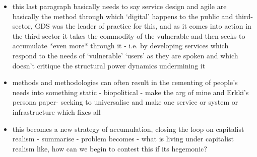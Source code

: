 \begin{itemize}
\item
  this last paragraph basically needs to say service design and agile
  are basically the method through which `digital' happens to the public
  and third-sector, GDS was the leader of practice for this, and as it
  comes into action in the third-sector it takes the commodity of the
  vulnerable and then seeks to accumulate *even more* through it - i.e.
  by developing services which respond to the needs of `vulnerable'
  `users' as they are spoken and which doesn't critique the structural
  power dynamics undermining it
\item
  methods and methodologies can often result in the cementing of
  people's needs into something static - biopolitical - make the arg of
  mine and Erkki's persona paper- seeking to universalise and make one
  service or system or infrastructure which fixes all
\item
  this becomes a new strategy of accumulation, closing the loop on
  capitalist realism - summarise - problem becomes - what is living
  under capitalist realism like, how can we begin to contest this if its
  hegemonic?
\end{itemize}
